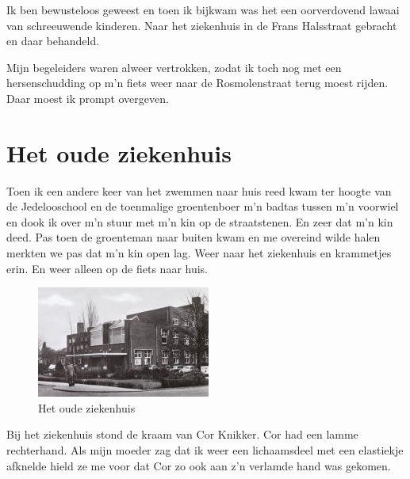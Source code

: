 \documentclass[12pt,twoside]{memoir}
\begin{document}
Ik ben bewusteloos geweest en toen ik bijkwam was het een oorverdovend lawaai van schreeuwende kinderen. Naar het ziekenhuis in de Frans Halsstraat gebracht en daar behandeld.

Mijn begeleiders waren alweer vertrokken, zodat ik toch nog met een hersenschudding op m’n fiets weer naar de Rosmolenstraat terug moest rijden. Daar moest ik prompt overgeven. 

\chapter{Het oude ziekenhuis} %
\label{cha:ziekenhuis}

Toen ik een andere keer van het zwemmen naar huis reed kwam ter hoogte van de Jedelooschool en de toenmalige groentenboer m’n badtas tussen m’n voorwiel en dook ik over m’n stuur met m’n kin op de straatstenen. En zeer dat m’n kin deed. Pas toen de groenteman naar buiten kwam en me overeind wilde halen merkten we pas dat m’n kin open lag. Weer naar het ziekenhuis en krammetjes erin. En weer alleen op de fiets naar huis.

\begin{figure}
\includegraphics[width=\textwidth]{img/ch12/zkhuis2}
\caption*{\footnotesize Het oude ziekenhuis}
\end{figure}

Bij het ziekenhuis stond de kraam van Cor Knikker. Cor had een lamme rechterhand. Als mijn moeder zag dat ik weer een lichaamsdeel met een elastiekje afknelde hield ze me voor dat Cor zo ook aan z’n verlamde hand was gekomen.
\end{document}
